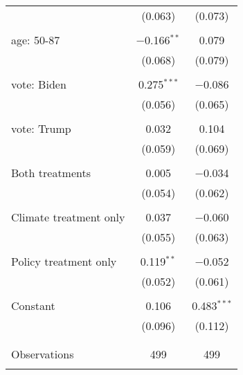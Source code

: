 \begin{tabular}{@{\extracolsep{5pt}}lcc}
  & (0.063) & (0.073) \\ 
  & & \\ 
 age: 50-87 & $-$0.166$^{**}$ & 0.079 \\ 
  & (0.068) & (0.079) \\ 
  & & \\ 
 vote: Biden & 0.275$^{***}$ & $-$0.086 \\ 
  & (0.056) & (0.065) \\ 
  & & \\ 
 vote: Trump & 0.032 & 0.104 \\ 
  & (0.059) & (0.069) \\ 
  & & \\ 
 Both treatments & 0.005 & $-$0.034 \\ 
  & (0.054) & (0.062) \\ 
  & & \\ 
 Climate treatment only & 0.037 & $-$0.060 \\ 
  & (0.055) & (0.063) \\ 
  & & \\ 
 Policy treatment only & 0.119$^{**}$ & $-$0.052 \\ 
  & (0.052) & (0.061) \\ 
  & & \\ 
 Constant & 0.106 & 0.483$^{***}$ \\ 
  & (0.096) & (0.112) \\ 
  & & \\ 
\hline \\[-1.8ex] 

Observations & 499 & 499 \\ 
\hline 
\hline \\[-1.8ex] 
\end{tabular} 